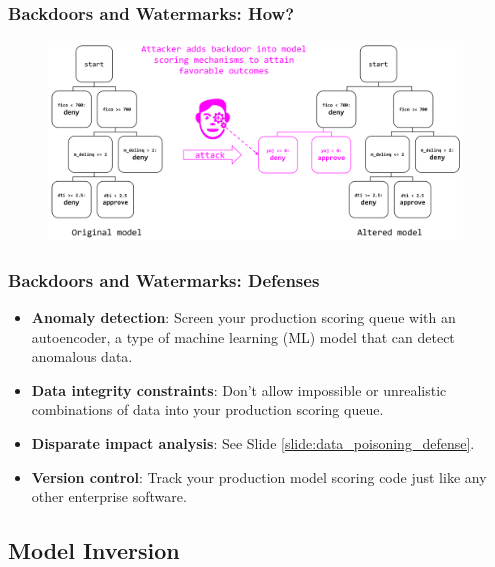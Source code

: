 \documentclass[11pt,
               aspectratio=169,
               hyperref={colorlinks}
               ]{beamer}
\begin{document}
			\begin{frame}
		
				\frametitle{Backdoors and Watermarks: \textbf{How?}}		
			
				\begin{figure}[htb]
					\begin{center}
						\includegraphics[height=150pt]{img/watermark.PNG}
					\end{center}
				\end{figure}	

			\end{frame}
		
			\begin{frame}[label={slide:watermark_defense}]
		
				\frametitle{Backdoors and Watermarks: \textbf{Defenses}}
				\begin{itemize}
				\item \textbf{Anomaly detection}: Screen your production scoring queue with an autoencoder, a type of machine learning (ML) model that can detect anomalous data. 
				\item \textbf{Data integrity constraints}: Don’t allow impossible or unrealistic combinations of data into your production scoring queue.
				\item \textbf{Disparate impact analysis}: See Slide \ref{slide:data_poisoning_defense}.
				\item \textbf{Version control}: Track your production model scoring code just like any other enterprise software.
				\end{itemize}
				
			\end{frame}


		\subsection{Model Inversion}
			
\end{document}
